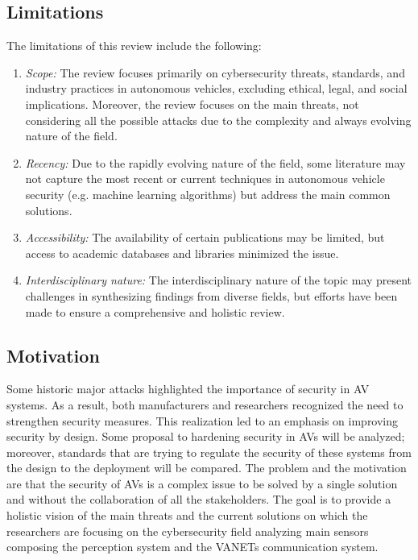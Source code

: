 \subsection{Limitations}\label{subsec:limitations}

The limitations of this review include the following:
\begin{enumerate}
    \item \textit{Scope:} The review focuses primarily on cybersecurity threats, standards, and industry practices in autonomous vehicles, excluding ethical, legal, and social implications.
    Moreover, the review focuses on the main threats, not considering all the possible attacks due to the complexity and always evolving nature of the field.
    \item \textit{Recency:} Due to the rapidly evolving nature of the field, some literature may not capture the most recent or current techniques in autonomous vehicle security (e.g. machine learning algorithms) but address the main common solutions.
    \item \textit{Accessibility:} The availability of certain publications may be limited, but access to academic databases and libraries minimized the issue.
    \item \textit{Interdisciplinary nature:} The interdisciplinary nature of the topic may present challenges in synthesizing findings from diverse fields, but efforts have been made to ensure a comprehensive and holistic review.
\end{enumerate}

\subsection{Motivation}\label{subsec:motivation}

Some historic major attacks highlighted the importance of security in AV systems.
As a result, both manufacturers and researchers recognized the need to strengthen security measures.
This realization led to an emphasis on improving security by design.
Some proposal to hardening security in AVs will be analyzed; moreover, standards that are trying to regulate the security of these systems from the design to the deployment will be compared.
The problem and the motivation are that the security of AVs is a complex issue to be solved by a single solution and without the collaboration of all the stakeholders\cite{comparison-standard}.
The goal is to provide a holistic vision of the main threats and the current solutions on which the researchers are focusing on the cybersecurity field
analyzing main sensors composing the perception system and the VANETs communication system.

\newpage

